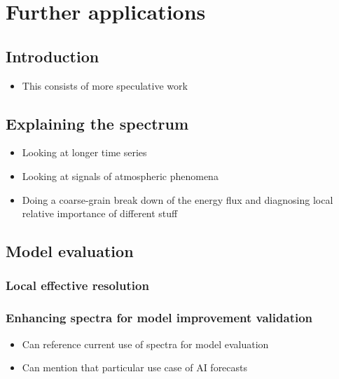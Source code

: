 \chapter{Further applications}
\label{chapter:future_work} 

\section{Introduction}

\begin{itemize}

\item{This consists of more speculative work}

\end{itemize}

\section{Explaining the spectrum}

\begin{itemize}

\item{Looking at longer time series}

\item{Looking at signals of atmospheric phenomena}

\item{Doing a coarse-grain break down of the energy flux and diagnosing local relative importance of different stuff}

\end{itemize}

\section{Model evaluation}

\subsection{Local effective resolution}

\subsection{Enhancing spectra for model improvement validation}

\begin{itemize}

\item{Can reference current use of spectra for model evaluation}

\item{Can mention that particular use case of AI forecasts}

\end{itemize}


